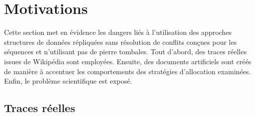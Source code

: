 
\section{Motivations}
\label{repl:sec:motivations}

Cette section met en évidence les dangers liés à l'utilisation des approches
structures de données répliquées sans résolution de conflits conçues pour les
séquences et n'utilisant pas de pierre tombales. Tout d'abord, des traces
réelles issues de Wikipédia sont employées. Ensuite, des documents artificiels
sont créés de manière à accentuer les comportements des stratégies d'allocation
examinées. Enfin, le problème scientifique est exposé.

\subsection{Traces réelles}

